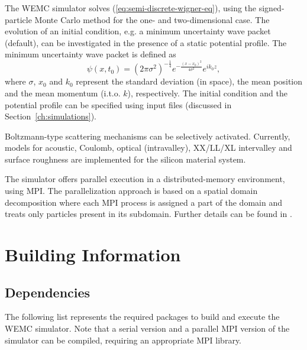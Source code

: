 The WEMC simulator solves (\ref{eq:semi-discrete-wigner-eq}), using the signed-particle Monte Carlo method \cite{Mixi_MCmethod_APL} for the one- and two-dimensional case. The evolution of an initial condition, e.g. a minimum uncertainty wave packet (default), can be investigated in the presence of a static potential profile. The minimum uncertainty wave packet is defined as
\begin{equation}
\psi\left(x,t_{0}\right)=\left(2\pi\sigma^{2}\right)^{-\frac{1}{4}}e^{-\frac{\left(x-x_{0}\right)^{2}}{4\sigma^{2}}}e^{ik_{0}z},\label{eq:initial_condition}
\end{equation}
where $\sigma$, $x_0$ and $k_0$ represent the standard deviation (in space), the mean position and the mean momentum (i.t.o. $k$), respectively. The initial condition and the potential profile can be specified using input files (discussed in Section~\ref{ch:simulations}). 

Boltzmann-type scattering mechanisms can be selectively activated. Currently, models for acoustic, Coulomb, optical (intravalley), XX/LL/XL intervalley and surface roughness are implemented for the silicon material system.

The simulator offers parallel execution in a distributed-memory environment, using MPI. The parallelization approach is based on a spatial domain decomposition where each MPI process is assigned a part of the domain and treats only particles present in its subdomain. Further details can be found in \cite{JCEL_MPI}\cite{JCEL_MPI_2}.



\section{Building Information} %

\subsection{Dependencies}

The following list represents the required packages to build and execute the WEMC simulator.
Note that a serial version and a parallel MPI version of the simulator can be compiled,
requiring an appropriate MPI library.


